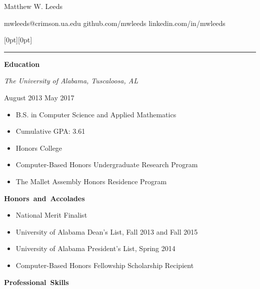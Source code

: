 \documentclass[11pt]{article}
\begin{document}
\centerline{\huge Matthew W. Leeds}
\vspace{0.4em}
\centerline{\normalsize mwleeds@crimson.ua.edu \space \textbar \space github.com/mwleeds \space \textbar \space linkedin.com/in/mwleeds}

\noindent \begin{minipage}[t]{\textwidth}
\raisebox{9pt}[0pt][0pt]{\rule{\textwidth}{0.2mm}\hspace{-\textwidth}}
\end{minipage}

\vspace{0.8em}
\hbox{\large \textbf{Education}}

\begin{minipage}[t]{0.65\textwidth}
\flushleft
\textit{The University of Alabama, Tuscaloosa, AL}\\
\end{minipage}
\begin{minipage}[t]{0.30\textwidth}
\flushright
August 2013 \space \textemdash \space May 2017\\
\end{minipage}

\begin{itemize}
  \item B.S. in Computer Science and Applied Mathematics
  \item Cumulative GPA: 3.61
  \item Honors College
  \item Computer-Based Honors Undergraduate Research Program
  \item The Mallet Assembly Honors Residence Program
\end{itemize}

\vspace{0.8em}
\hbox{\large \textbf{Honors and Accolades}}

\begin{itemize}
  \item National Merit Finalist
  \item University of Alabama Dean's List, Fall 2013 and Fall 2015
  \item University of Alabama President's List, Spring 2014
  \item Computer-Based Honors Fellowship Scholarship Recipient
\end{itemize}

\vspace{0.8em}
\hbox{\large \textbf{Professional Skills}}
\end{document}
